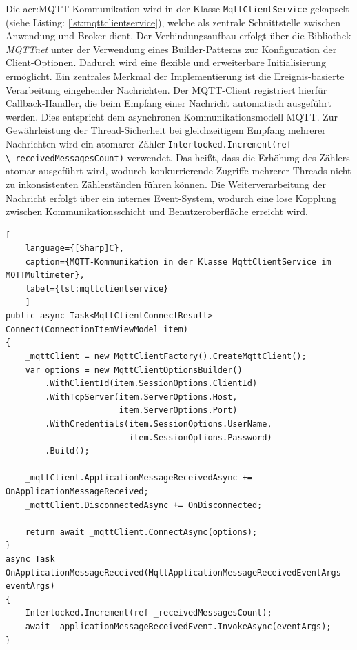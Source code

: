     Die \acrshort{acr:MQTT}-Kommunikation wird in der Klasse \lstinline{MqttClientService} gekapselt (siehe Listing: \ref{lst:mqttclientservice}), welche als zentrale Schnittstelle zwischen Anwendung und Broker dient. Der Verbindungsaufbau erfolgt über die Bibliothek \textit{MQTTnet} unter der Verwendung eines Builder-Patterns zur Konfiguration der Client-Optionen. Dadurch wird eine flexible und erweiterbare Initialisierung ermöglicht. Ein zentrales Merkmal der Implementierung ist die Ereignis-basierte Verarbeitung eingehender Nachrichten. Der MQTT-Client registriert hierfür Callback-Handler, die beim Empfang einer Nachricht automatisch ausgeführt werden. Dies entspricht dem asynchronen Kommunikationsmodell MQTT. Zur Gewährleistung der Thread-Sicherheit bei gleichzeitigem Empfang mehrerer Nachrichten wird ein atomarer Zähler \lstinline{Interlocked.Increment(ref \_receivedMessagesCount)} verwendet. Das heißt, dass die Erhöhung des Zählers atomar ausgeführt wird, wodurch konkurrierende Zugriffe mehrerer Threads nicht zu inkonsistenten Zählerständen führen können. Die Weiterverarbeitung der Nachricht erfolgt über ein internes Event-System, wodurch eine lose Kopplung zwischen Kommunikationsschicht und Benutzeroberfläche erreicht wird. 

    \begin{lstlisting}[
    language={[Sharp]C},
    caption={MQTT-Kommunikation in der Klasse MqttClientService im MQTTMultimeter},
    label={lst:mqttclientservice}
    ]    
public async Task<MqttClientConnectResult> Connect(ConnectionItemViewModel item)
{
    _mqttClient = new MqttClientFactory().CreateMqttClient();
    var options = new MqttClientOptionsBuilder()
        .WithClientId(item.SessionOptions.ClientId)
        .WithTcpServer(item.ServerOptions.Host, 
                       item.ServerOptions.Port)
        .WithCredentials(item.SessionOptions.UserName, 
                         item.SessionOptions.Password)
        .Build();

    _mqttClient.ApplicationMessageReceivedAsync += OnApplicationMessageReceived;
    _mqttClient.DisconnectedAsync += OnDisconnected;

    return await _mqttClient.ConnectAsync(options);
}
async Task OnApplicationMessageReceived(MqttApplicationMessageReceivedEventArgs eventArgs)
{
    Interlocked.Increment(ref _receivedMessagesCount);
    await _applicationMessageReceivedEvent.InvokeAsync(eventArgs);
}
    \end{lstlisting}

